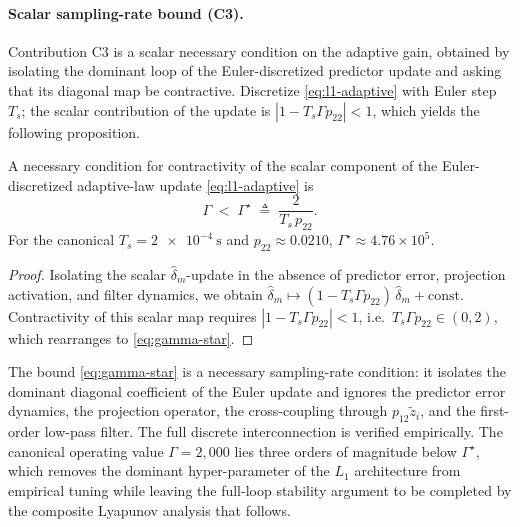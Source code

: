 \paragraph{Scalar sampling-rate bound (C3).} Contribution C3 is a scalar necessary condition on the adaptive gain, obtained by isolating the dominant loop of the Euler-discretized predictor update and asking that its diagonal map be contractive. Discretize \eqref{eq:l1-adaptive} with Euler step $T_s$; the scalar contribution of the update is $|1 - T_s\Gamma p_{22}| < 1$, which yields the following proposition.

\begin{proposition}
\label{prop:gamma-star}
A necessary condition for contractivity of the scalar component of the Euler-discretized adaptive-law update \eqref{eq:l1-adaptive} is
\begin{equation}
  \Gamma \;<\; \Gamma^\star
    \;\triangleq\; \frac{2}{T_s\,p_{22}}.
  \label{eq:gamma-star}
\end{equation}
For the canonical $T_s = \SI{2e-4}{\second}$ and
$p_{22} \approx 0.0210$,
$\Gamma^\star \approx 4.76\times 10^5$.
\end{proposition}

\begin{proof}
Isolating the scalar $\hat\delta_m$-update in the absence of predictor error, projection activation, and filter dynamics, we obtain $\hat\delta_m \mapsto (1 - T_s\Gamma p_{22})\,\hat\delta_m + \mathrm{const}$. Contractivity of this scalar map requires $|1 - T_s\Gamma p_{22}| < 1$, i.e.\
$T_s\Gamma p_{22} \in (0, 2)$, which rearranges to \eqref{eq:gamma-star}.
\end{proof}

\begin{remark}
The bound \eqref{eq:gamma-star} is a necessary sampling-rate condition: it isolates the dominant diagonal coefficient of the Euler update and ignores the predictor error dynamics, the projection operator, the cross-coupling through $p_{12}\tilde z_i$, and the first-order low-pass filter. The full discrete interconnection is verified empirically. The canonical operating value $\Gamma = 2{,}000$ lies three orders of magnitude below $\Gamma^\star$, which removes the dominant hyper-parameter of the $L_1$ architecture from empirical tuning while leaving the full-loop stability argument to be completed by the composite Lyapunov analysis that follows.
\end{remark}

